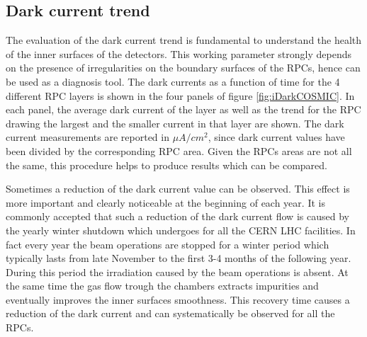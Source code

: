 \subsection{Dark current trend}
The evaluation of the dark current trend is fundamental to understand the health of the inner surfaces of the detectors.
This working parameter strongly depends on the presence of irregularities on the boundary surfaces of the RPCs, hence can be used as a diagnosis tool.
The dark currents as a function of time for the 4 different RPC layers is shown in the four panels of figure \ref{fig:iDarkCOSMIC}. 
In each panel, the average dark current of the layer as well as the trend for the RPC drawing the largest and the smaller current in that layer are shown.
The dark current measurements are reported in $\mu A/cm^2$, since dark current values have been divided by the corresponding RPC area.
Given the RPCs areas are not all the same, this procedure helps to produce results which can be compared.


Sometimes a reduction of the dark current value can be observed.
This effect is more important and clearly noticeable at the beginning of each year.
It is commonly accepted that such a reduction of the dark current flow is caused by the yearly winter shutdown which undergoes for all the CERN LHC facilities.
In fact every year the beam operations are stopped for a winter period which typically lasts from late November to the first 3-4 months of the following year.
During this period the irradiation caused by the beam operations is absent.
At the same time the gas flow trough the chambers extracts impurities and eventually improves the inner surfaces smoothness.
This recovery time causes a reduction of the dark current and can systematically be observed for all the RPCs.

